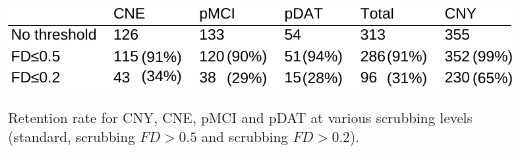 \documentclass[authoryear]{elsarticle}
\begin{document}
\begin{table}[H]
\begin{center}
\includegraphics[width=0.75\linewidth]{../figures/table_retention.pdf}
\end{center}
\caption[Retention table after scrubbing]{
Retention rate for CNY, CNE, pMCI and pDAT at various scrubbing levels (standard, scrubbing $FD>0.5$ and scrubbing $FD >0.2$).
}
\label{tab_retention}
\end{table}
\end{document}
